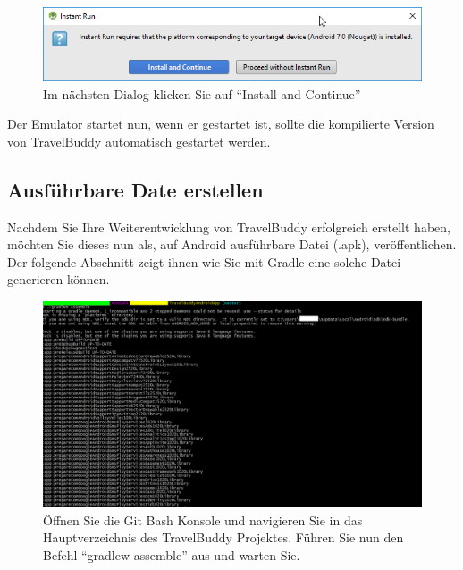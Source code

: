 \documentclass[a4paper,10pt,xetex]{article}
\begin{document}
\begin{figure}
  \centering
  \includegraphics[width=\textwidth]{Installation/3-8}
  \caption{Im nächsten Dialog klicken Sie auf ``Install and Continue''}
\end{figure}

Der Emulator startet nun, wenn er gestartet ist, sollte die kompilierte Version von TravelBuddy automatisch gestartet werden.
\subsection{Ausführbare Date erstellen}
Nachdem Sie Ihre Weiterentwicklung von TravelBuddy erfolgreich erstellt haben, möchten Sie dieses nun als, auf Android ausführbare Datei (.apk), veröffentlichen.
Der folgende Abschnitt zeigt ihnen wie Sie mit Gradle eine solche Datei generieren können.

\begin{figure}
  \centering
  \includegraphics[width=\textwidth]{Installation/4-1}
  \caption{Öffnen Sie die Git Bash Konsole und navigieren Sie in das Hauptverzeichnis des TravelBuddy Projektes. Führen Sie nun den Befehl ``gradlew assemble'' aus und warten Sie.}
\end{figure}
\end{document}

